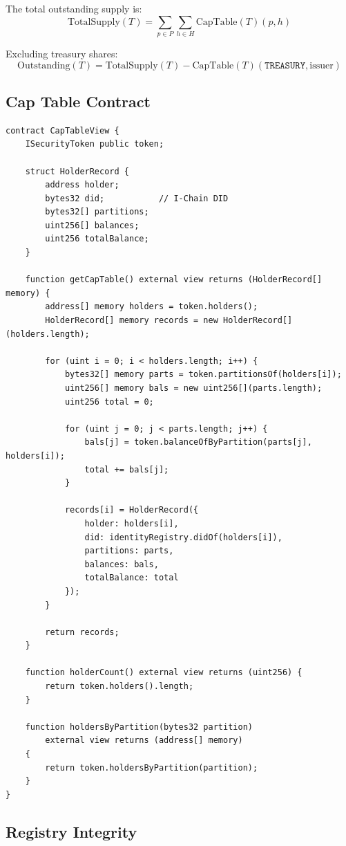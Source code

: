 \documentclass[11pt,a4paper]{article}
\begin{document}
The total outstanding supply is:
\[
\text{TotalSupply}(T) = \sum_{p \in P} \sum_{h \in H} \text{CapTable}(T)(p, h)
\]

Excluding treasury shares:
\[
\text{Outstanding}(T) = \text{TotalSupply}(T) - \text{CapTable}(T)(\texttt{TREASURY}, \text{issuer})
\]

\subsection{Cap Table Contract}

\begin{lstlisting}[language=Solidity,caption={Cap table view contract.}]
contract CapTableView {
    ISecurityToken public token;

    struct HolderRecord {
        address holder;
        bytes32 did;           // I-Chain DID
        bytes32[] partitions;
        uint256[] balances;
        uint256 totalBalance;
    }

    function getCapTable() external view returns (HolderRecord[] memory) {
        address[] memory holders = token.holders();
        HolderRecord[] memory records = new HolderRecord[](holders.length);

        for (uint i = 0; i < holders.length; i++) {
            bytes32[] memory parts = token.partitionsOf(holders[i]);
            uint256[] memory bals = new uint256[](parts.length);
            uint256 total = 0;

            for (uint j = 0; j < parts.length; j++) {
                bals[j] = token.balanceOfByPartition(parts[j], holders[i]);
                total += bals[j];
            }

            records[i] = HolderRecord({
                holder: holders[i],
                did: identityRegistry.didOf(holders[i]),
                partitions: parts,
                balances: bals,
                totalBalance: total
            });
        }

        return records;
    }

    function holderCount() external view returns (uint256) {
        return token.holders().length;
    }

    function holdersByPartition(bytes32 partition)
        external view returns (address[] memory)
    {
        return token.holdersByPartition(partition);
    }
}
\end{lstlisting}

\subsection{Registry Integrity}
\end{document}
